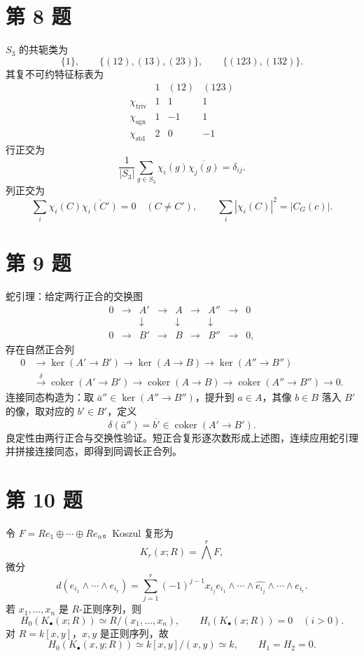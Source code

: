 \documentclass[11pt]{article}
\begin{document}
\section*{第 8 题}

\(S_3\) 的共轭类为
\[
  \{1\},\qquad \{(12),(13),(23)\},\qquad \{(123),(132)\}.
\]
其复不可约特征标表为
\[
\begin{array}{c|ccc}
&1&(12)&(123)\\
\hline
\chi_{\mathrm{triv}}&1&1&1\\
\chi_{\mathrm{sgn}}&1&-1&1\\
\chi_{\mathrm{std}}&2&0&-1
\end{array}
\]
行正交为
\[
  \frac1{|S_3|}\sum_{g\in S_3}\chi_i(g)\overline{\chi_j(g)}=\delta_{ij}.
\]
列正交为
\[
  \sum_i\chi_i(C)\overline{\chi_i(C')}
  =0\quad(C\neq C'),\qquad
  \sum_i|\chi_i(C)|^2=|C_G(c)|.
\]

\section*{第 9 题}

蛇引理：给定两行正合的交换图
\[
\begin{array}{ccccccccc}
0&\to&A'&\to&A&\to&A''&\to&0\\
 &&\downarrow&&\downarrow&&\downarrow&&\\
0&\to&B'&\to&B&\to&B''&\to&0,
\end{array}
\]
存在自然正合列
\[
\begin{aligned}
0&\to\ker(A'\to B')\to\ker(A\to B)\to\ker(A''\to B'')\\
&\xrightarrow{\delta}
\operatorname{coker}(A'\to B')\to\operatorname{coker}(A\to B)\to
\operatorname{coker}(A''\to B'')\to0.
\end{aligned}
\]
连接同态构造为：取 \(\bar a''\in\ker(A''\to B'')\)，提升到 \(a\in A\)，其像 \(b\in B\) 落入 \(B'\) 的像，取对应的 \(b'\in B'\)，定义
\[
  \delta(\bar a'')=\overline{b'}\in \operatorname{coker}(A'\to B').
\]
良定性由两行正合与交换性验证。短正合复形逐次数形成上述图，连续应用蛇引理并拼接连接同态，即得到同调长正合列。

\section*{第 10 题}

令 \(F=Re_1\oplus\cdots\oplus Re_n\)。Koszul 复形为
\[
  K_r(x;R)=\bigwedge^r F,
\]
微分
\[
  d(e_{i_1}\wedge\cdots\wedge e_{i_r})
  =
  \sum_{j=1}^r(-1)^{j-1}x_{i_j}
  e_{i_1}\wedge\cdots\wedge\widehat{e_{i_j}}\wedge\cdots\wedge e_{i_r}.
\]
若 \(x_1,\dots,x_n\) 是 \(R\)-正则序列，则
\[
  H_0(K_\bullet(x;R))\simeq R/(x_1,\dots,x_n),\qquad
  H_i(K_\bullet(x;R))=0\quad(i>0).
\]
对 \(R=k[x,y]\)，\(x,y\) 是正则序列，故
\[
  H_0(K_\bullet(x,y;R))\simeq k[x,y]/(x,y)\simeq k,\qquad
  H_1=H_2=0.
\]
\end{document}
